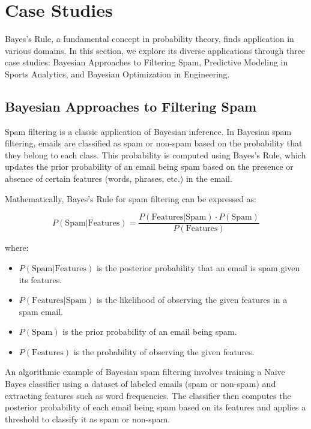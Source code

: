 \documentclass[12pt]{book} %
\begin{document}
\section{Case Studies}

Bayes's Rule, a fundamental concept in probability theory, finds application in various domains. In this section, we explore its diverse applications through three case studies: Bayesian Approaches to Filtering Spam, Predictive Modeling in Sports Analytics, and Bayesian Optimization in Engineering.

\subsection{Bayesian Approaches to Filtering Spam}

Spam filtering is a classic application of Bayesian inference. In Bayesian spam filtering, emails are classified as spam or non-spam based on the probability that they belong to each class. This probability is computed using Bayes's Rule, which updates the prior probability of an email being spam based on the presence or absence of certain features (words, phrases, etc.) in the email.

Mathematically, Bayes's Rule for spam filtering can be expressed as:

\[
P(\text{{Spam}} | \text{{Features}}) = \frac{P(\text{{Features}} | \text{{Spam}}) \cdot P(\text{{Spam}})}{P(\text{{Features}})}
\]

where:
\begin{itemize}
    \item \(P(\text{{Spam}} | \text{{Features}})\) is the posterior probability that an email is spam given its features.
    \item \(P(\text{{Features}} | \text{{Spam}})\) is the likelihood of observing the given features in a spam email.
    \item \(P(\text{{Spam}})\) is the prior probability of an email being spam.
    \item \(P(\text{{Features}})\) is the probability of observing the given features.
\end{itemize}

An algorithmic example of Bayesian spam filtering involves training a Naive Bayes classifier using a dataset of labeled emails (spam or non-spam) and extracting features such as word frequencies. The classifier then computes the posterior probability of each email being spam based on its features and applies a threshold to classify it as spam or non-spam.
\end{document}

